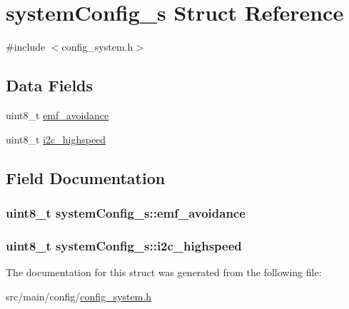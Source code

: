 \hypertarget{structsystemConfig__s}{\section{system\+Config\+\_\+s Struct Reference}
\label{structsystemConfig__s}
}


{\ttfamily \#include $<$config\+\_\+system.\+h$>$}

\subsection*{Data Fields}
\begin{DoxyCompactItemize}
\item 
uint8\+\_\+t \hyperlink{structsystemConfig__s_a7b4ef1510ef6477e3b86d883235ccb07}{emf\+\_\+avoidance}
\item 
uint8\+\_\+t \hyperlink{structsystemConfig__s_adfbafee47a0716a6a30642c41d1b1931}{i2c\+\_\+highspeed}
\end{DoxyCompactItemize}


\subsection{Field Documentation}
\hypertarget{structsystemConfig__s_a7b4ef1510ef6477e3b86d883235ccb07}{
\subsubsection[{emf\+\_\+avoidance}]{\setlength{\rightskip}{0pt plus 5cm}uint8\+\_\+t system\+Config\+\_\+s\+::emf\+\_\+avoidance}}\label{structsystemConfig__s_a7b4ef1510ef6477e3b86d883235ccb07}
\hypertarget{structsystemConfig__s_adfbafee47a0716a6a30642c41d1b1931}{
\subsubsection[{i2c\+\_\+highspeed}]{\setlength{\rightskip}{0pt plus 5cm}uint8\+\_\+t system\+Config\+\_\+s\+::i2c\+\_\+highspeed}}\label{structsystemConfig__s_adfbafee47a0716a6a30642c41d1b1931}


The documentation for this struct was generated from the following file\+:\begin{DoxyCompactItemize}
\item 
src/main/config/\hyperlink{config__system_8h}{config\+\_\+system.\+h}\end{DoxyCompactItemize}

